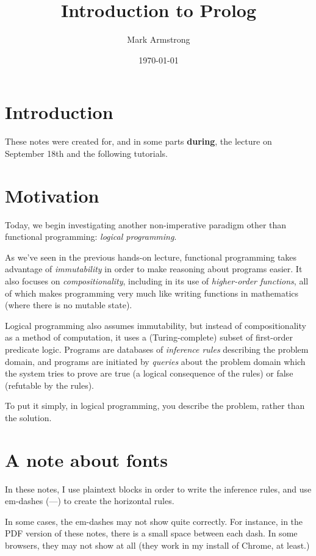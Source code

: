 \documentclass[11pt]{article}
\author{Mark Armstrong}
\date{\today}
\title{Introduction to Prolog}
\begin{document}
\maketitle
\tableofcontents


\section{Introduction}
\label{sec:org39e7144}
These notes were created for, and in some parts \textbf{during},
the lecture on September 18th and the following tutorials.

\section{Motivation}
\label{sec:org0cd1665}
Today, we begin investigating another non-imperative paradigm
other than functional programming: \emph{logical programming}.

As we've seen in the previous hands-on lecture,
functional programming takes advantage of \emph{immutability} in order
to make reasoning about programs easier.
It also focuses on \emph{compositionality}, including
in its use of \emph{higher-order functions}, all of which
makes programming very much like writing functions in mathematics
(where there is no mutable state).

Logical programming also assumes immutability,
but instead of compositionality as a method of computation,
it uses a (Turing-complete) subset of first-order predicate logic.
Programs are databases of \emph{inference rules} describing the problem domain,
and programs are initiated by \emph{queries} about the problem domain which
the system tries to prove are true (a logical consequence of the rules)
or false (refutable by the rules).

To put it simply, in logical programming, you describe the problem,
rather than the solution.

\section{A note about fonts}
\label{sec:org9f777a2}
In these notes, I use plaintext blocks in order to write the
inference rules, and use em-dashes (—) to create the horizontal rules.

In some cases, the em-dashes may not show quite correctly.
For instance, in the PDF version of these notes, there is
a small space between each dash. In some browsers, they
may not show at all (they work in my install of Chrome, at least.)
\end{document}
